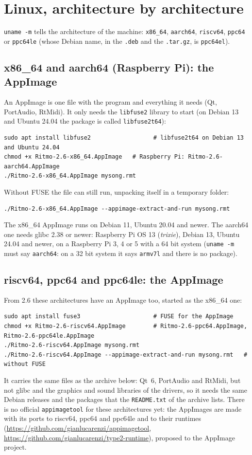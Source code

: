 \section{Linux, architecture by architecture}\label{sec:linux-arch}

\texttt{uname -m} tells the architecture of the machine: \texttt{x86\_64}, \texttt{aarch64}, \texttt{riscv64}, \texttt{ppc64} or
\texttt{ppc64le} (whose Debian name, in the \texttt{.deb} and the \texttt{.tar.gz}, is \texttt{ppc64el}).

\subsection{x86\_64 and aarch64 (Raspberry Pi): the AppImage}

An AppImage is one file with the program and everything it needs (Qt, PortAudio, RtMidi). It only needs the
\texttt{libfuse2} library to start (on Debian 13 and Ubuntu 24.04 the package is called \texttt{libfuse2t64}):
\begin{lstlisting}
sudo apt install libfuse2                  # libfuse2t64 on Debian 13 and Ubuntu 24.04
chmod +x Ritmo-2.6-x86_64.AppImage   # Raspberry Pi: Ritmo-2.6-aarch64.AppImage
./Ritmo-2.6-x86_64.AppImage mysong.rmt
\end{lstlisting}
Without FUSE the file can still run, unpacking itself in a temporary folder:
\begin{lstlisting}
./Ritmo-2.6-x86_64.AppImage --appimage-extract-and-run mysong.rmt
\end{lstlisting}
The x86\_64 AppImage runs on Debian 11, Ubuntu 20.04 and newer. The aarch64 one needs glibc 2.38 or newer: Raspberry Pi OS 13
(\emph{trixie}), Debian 13, Ubuntu 24.04 and newer, on a Raspberry Pi 3, 4 or 5 with a 64 bit system (\texttt{uname -m} must say
\texttt{aarch64}: on a 32 bit system it says \texttt{armv7l} and there is no package).

\subsection{riscv64, ppc64 and ppc64le: the AppImage}

From 2.6 these architectures have an AppImage too, started as the x86\_64 one:
\begin{lstlisting}
sudo apt install fuse3                     # FUSE for the AppImage
chmod +x Ritmo-2.6-riscv64.AppImage        # Ritmo-2.6-ppc64.AppImage, Ritmo-2.6-ppc64le.AppImage
./Ritmo-2.6-riscv64.AppImage mysong.rmt
./Ritmo-2.6-riscv64.AppImage --appimage-extract-and-run mysong.rmt   # without FUSE
\end{lstlisting}
It carries the same files as the archive below: Qt~6, PortAudio and RtMidi, but not glibc and the graphics and sound
libraries of the drivers, so it needs the same Debian releases and the packages that the \texttt{README.txt} of the archive
lists. There is no official \texttt{appimagetool} for these architectures yet: the AppImages are made with its ports to
riscv64, ppc64 and ppc64le and to their runtimes (\url{https://github.com/gianlucarenzi/appimagetool},
\url{https://github.com/gianlucarenzi/type2-runtime}), proposed to the AppImage project.

